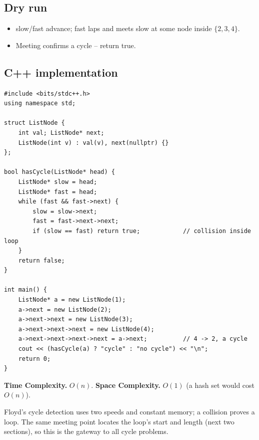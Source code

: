 \subsection*{Dry run}


\begin{itemize}
  \item slow/fast advance; fast laps and meets slow at some node inside
        $\{2,3,4\}$.
  \item Meeting confirms a cycle -- return true.
\end{itemize}

\subsection*{C++ implementation}

\begin{lstlisting}
#include <bits/stdc++.h>
using namespace std;

struct ListNode {
    int val; ListNode* next;
    ListNode(int v) : val(v), next(nullptr) {}
};

bool hasCycle(ListNode* head) {
    ListNode* slow = head;
    ListNode* fast = head;
    while (fast && fast->next) {
        slow = slow->next;
        fast = fast->next->next;
        if (slow == fast) return true;            // collision inside loop
    }
    return false;
}

int main() {
    ListNode* a = new ListNode(1);
    a->next = new ListNode(2);
    a->next->next = new ListNode(3);
    a->next->next->next = new ListNode(4);
    a->next->next->next->next = a->next;          // 4 -> 2, a cycle
    cout << (hasCycle(a) ? "cycle" : "no cycle") << "\n";
    return 0;
}
\end{lstlisting}

\begin{complexitybox}
\textbf{Time Complexity.} $O(n)$. \textbf{Space Complexity.} $O(1)$ (a hash
set would cost $O(n)$).
\end{complexitybox}

\begin{takeawaybox}
Floyd's cycle detection uses two speeds and constant memory; a collision
proves a loop. The same meeting point locates the loop's start and length
(next two sections), so this is the gateway to all cycle problems.
\end{takeawaybox}
